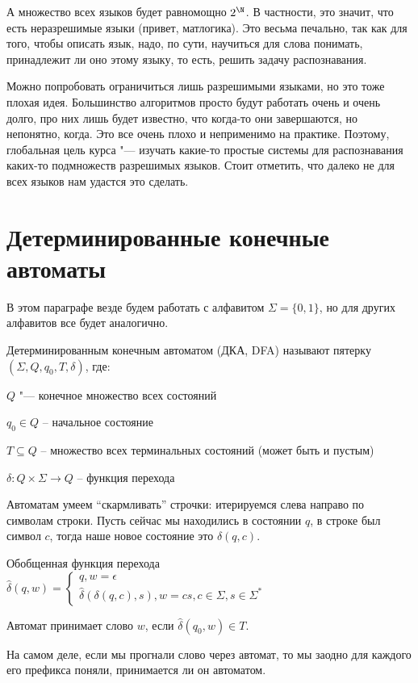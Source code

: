 А множество всех языков будет равномощно $2^\N$. В частности, это значит, что есть неразрешимые языки (привет, матлогика). 
Это весьма печально, так как для того, чтобы описать язык, надо, по сути, научиться для слова понимать, принадлежит ли оно этому языку, то есть, решить задачу распознавания.

Можно попробовать ограничиться лишь разрешимыми языками, но это тоже плохая идея. 
Большинство алгоритмов просто будут работать очень и очень долго, про них лишь будет известно, что когда-то они завершаются, но непонятно, когда. Это все очень плохо и неприменимо на практике.
Поэтому, глобальная цель курса "--- изучать какие-то простые системы для распознавания каких-то подмножеств разрешимых языков. 
Стоит отметить, что далеко не для всех языков нам удастся это сделать.


\chapter{Детерминированные конечные автоматы}
В этом параграфе везде будем работать с алфавитом $\Sigma = \{0, 1\}$, но для других алфавитов все будет аналогично.

\begin{Def}
Детерминированным конечным автоматом (ДКА, DFA) называют пятерку $(\Sigma, Q, q_0, T, \delta)$, где:

$Q$ "--- конечное множество всех состояний

$q_0 \in Q$ -- начальное состояние

$T \subseteq Q$ -- множество всех терминальных состояний (может быть и пустым)

$\delta: Q \times \Sigma \to Q$ -- функция перехода

Автоматам умеем ``скармливать'' строчки: итерируемся слева направо по символам строки. 
Пусть сейчас мы находились в состоянии $q$, в строке был символ $c$, тогда наше новое состояние это $\delta(q, c)$.
\end{Def}

\begin{Def}
Обобщенная функция перехода $\hat \delta(q, w) =     
    \begin{cases}
        q, w = \epsilon \\
        \hat \delta(\delta(q, c), s), w = cs, c \in \Sigma, s \in \Sigma^*
    \end{cases}
$
\end{Def}

\begin{Def}
    Автомат принимает слово $w$, если $\hat \delta(q_0, w) \in T$.
\end{Def}
\begin{Rem}
    На самом деле, если мы прогнали слово через автомат, то мы заодно для каждого его префикса поняли, принимается ли он автоматом.
\end{Rem}

